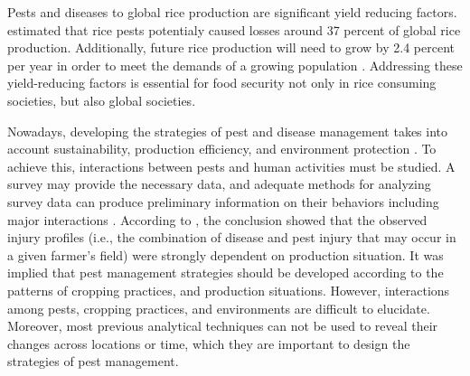 
Pests and diseases to global rice production are significant yield reducing factors.  estimated that rice pests potentialy caused losses around 37 percent of global rice production. Additionally, future rice production will need to grow by 2.4 percent per year in order to meet the demands of a growing population . Addressing these yield-reducing factors is essential for food security not only in rice consuming societies, but also global societies. 

Nowadays, developing the strategies of pest and disease management takes into account sustainability, production efficiency, and environment protection \cite{Mew:2004kh}. To achieve this, interactions between pests and human activities must be studied. A survey may provide the necessary data, and adequate methods for analyzing survey data can produce preliminary information on their behaviors including major interactions . According to , the conclusion showed that the observed injury profiles (i.e., the combination of disease and pest injury that may occur in a given farmer’s field) were strongly dependent on production situation. It was implied that pest management strategies should be developed according to the patterns of cropping practices, and production situations. However, interactions among pests, cropping practices, and environments are difficult to elucidate. Moreover, most previous analytical techniques can not be used to reveal their changes across locations or time, which they are important to design the strategies of pest management. 

